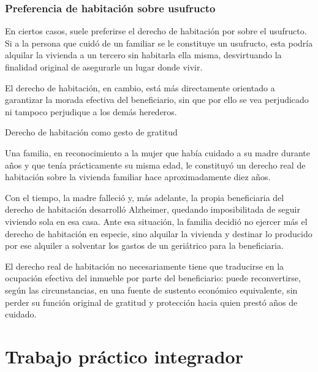 \documentclass[12pt,oneside]{book}
\begin{document}
\subsection{Preferencia de habitación sobre usufructo}

En ciertos casos, suele preferirse el derecho de habitación por sobre el usufructo. Si a la persona que cuidó de un familiar se le constituye un usufructo, esta podría alquilar la vivienda a un tercero sin habitarla ella misma, desvirtuando la finalidad original de asegurarle un lugar donde vivir.

El derecho de habitación, en cambio, está más directamente orientado a garantizar la morada efectiva del beneficiario, sin que por ello se vea perjudicado ni tampoco perjudique a los demás herederos.

\begin{example}{Derecho de habitación como gesto de gratitud}

Una familia, en reconocimiento a la mujer que había cuidado a su madre durante años y que tenía prácticamente su misma edad, le constituyó un derecho real de habitación sobre la vivienda familiar hace aproximadamente diez años.

Con el tiempo, la madre falleció y, más adelante, la propia beneficiaria del derecho de habitación desarrolló Alzheimer, quedando imposibilitada de seguir viviendo sola en esa casa. Ante esa situación, la familia decidió no ejercer más el derecho de habitación en especie, sino alquilar la vivienda y destinar lo producido por ese alquiler a solventar los gastos de un geriátrico para la beneficiaria.

El derecho real de habitación no necesariamente tiene que traducirse en la ocupación efectiva del inmueble por parte del beneficiario: puede reconvertirse, según las circunstancias, en una fuente de sustento económico equivalente, sin perder su función original de gratitud y protección hacia quien prestó años de cuidado.

\end{example}


\chapter{Trabajo práctico integrador}
\end{document}
